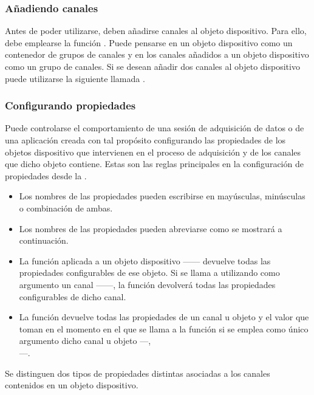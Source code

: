 \subsubsection{Añadiendo canales}

Antes de poder utilizarse, deben añadirse canales al objeto dispositivo.
Para ello, debe emplearse la función . Puede pensarse en
un objeto dispositivo como un contenedor de grupos de canales y en los
canales añadidos a un objeto dispositivo como un grupo de canales. Si se
desean añadir dos canales al objeto dispositivo  puede
utilizarse la siguiente llamada .


\subsubsection{Configurando propiedades}

Puede controlarse el comportamiento de una sesión de adquisición de datos o
de una aplicación creada con tal propósito configurando las propiedades de
los objetos dispositivo que intervienen en el proceso de adquisición y de
los canales que dicho objeto contiene. Estas son las reglas principales en
la configuración de propiedades desde la \datx{}.

\begin{itemize}
	\item Los nombres de las propiedades pueden escribirse en
		mayúsculas, minúsculas o combinación de ambas.
	\item Los nombres de las propiedades pueden abreviarse como se
		mostrará a continuación. %
	\item La función  aplicada a un objeto dispositivo
		------ devuelve todas las propiedades
		configurables de ese objeto. Si se llama a 
		utilizando como argumento un canal
		------, la función
		devolverá todas las propiedades configurables de dicho
		canal.
	\item La función  devuelve todas las propiedades de un
		canal u objeto y el valor que toman en el momento en el que
		se llama a la función si se emplea como único argumento
		dicho canal u objeto ---, \\
		---.
\end{itemize}

Se distinguen dos tipos de propiedades distintas asociadas a los canales
contenidos en un objeto dispositivo.

